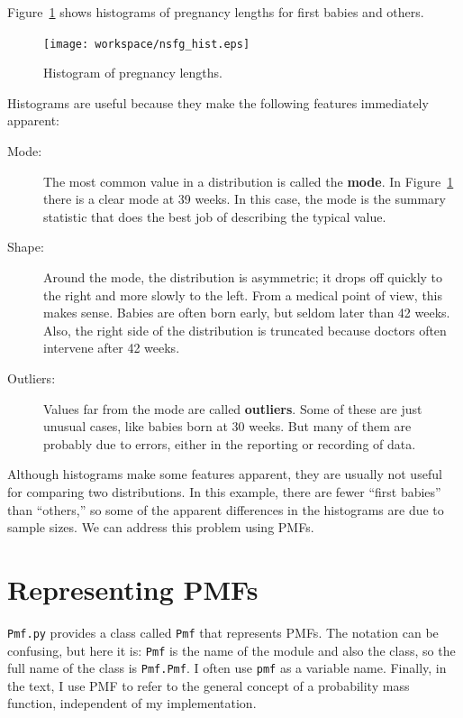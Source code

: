\documentclass[12pt]{book}
\begin{document}
Figure~\ref{nsfg_hist} shows histograms of pregnancy lengths for
first babies and others.

\begin{figure}
\centerline{\texttt{[image: workspace/nsfg\_hist.eps]}}
\caption{Histogram of pregnancy lengths.}
\label{nsfg_hist}
\end{figure}

Histograms are useful because they make the following features immediately
apparent:

\begin{description}

\item[Mode:] The most common value in a distribution is called the
  {\bf mode}.  In Figure~\ref{nsfg_hist} there is a clear mode at 39
  weeks.  In this case, the mode is the summary statistic that does
  the best job of describing the typical value.

\item[Shape:] Around the mode, the distribution is asymmetric; it
  drops off quickly to the right and more slowly to the left.  From a
  medical point of view, this makes sense.  Babies are often born
  early, but seldom later than 42 weeks.  Also, the right side of the
  distribution is truncated because doctors often intervene after 42
  weeks.

\item[Outliers:] Values far from the mode are called {\bf outliers}.
  Some of these are just unusual cases, like babies born at 30 weeks.
  But many of them are probably due to errors, either in the reporting
  or recording of data.

\end{description}

Although histograms make some features apparent, they are usually not
useful for comparing two distributions.  In this example, there are
fewer ``first babies'' than ``others,'' so some of the apparent
differences in the histograms are due to sample sizes.  We can
address this problem using PMFs.


\section{Representing PMFs}

{\tt Pmf.py} provides a class called {\tt Pmf} that represents PMFs.
The notation can be confusing, but here it is: {\tt Pmf} is the
name of the module and also the class, so the full name of the class
is {\tt Pmf.Pmf}.  I often use {\tt pmf} as a variable name.
Finally, in the text, I use PMF to refer to the general concept
of a probability mass function, independent of my implementation.
\end{document}
